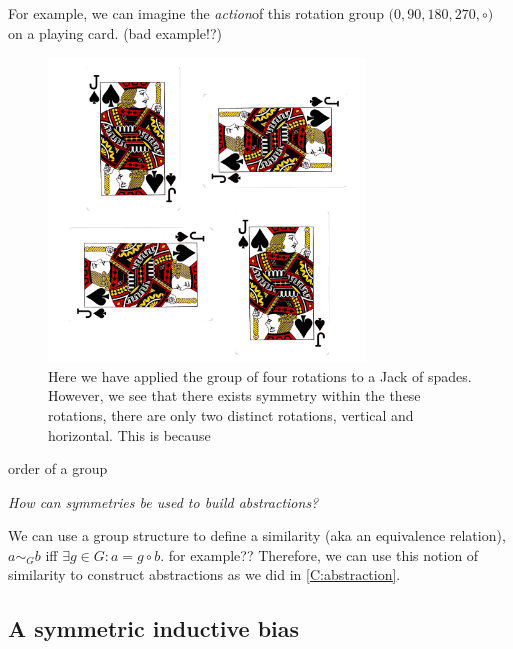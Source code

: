 For example, we can imagine the \textit{action}\footnotemark[37] of this rotation group $\big(0, 90, 180, 270, \circ \big)$ on a playing card. (bad example!?)


\begin{figure}[h!]
	\centering
	\includegraphics[width=0.75\textwidth,height=0.5\textheight]{../../pictures/images/jacks.png}
	\caption{Here we have applied the group of four rotations to a Jack of spades.
	However, we see that there exists symmetry within the these rotations,
	there are only two distinct rotations, vertical and horizontal. This is because }
\end{figure}

{\color{red}order of a group}

\begin{displayquote}
\textsl{How can symmetries be used to build abstractions?}
\end{displayquote}

We can use a group structure to define a similarity (aka an equivalence relation),
$a \sim_G b$ iff $\exists g \in G: a = g \circ b$. {\color{red} for example??}
Therefore, we can use this
notion of similarity to construct abstractions as we did in \ref{C:abstraction}.


\subsection{A symmetric inductive bias}

